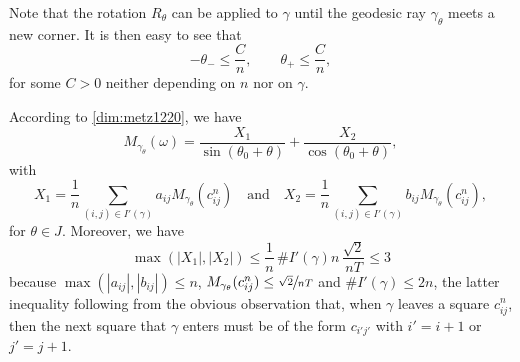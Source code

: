 \documentclass[10pt]{amsart}
\theoremstyle{definition}
\begin{document}
Note that the rotation $R_\theta$ can be applied to $\gamma$ until the geodesic ray $\gamma_\theta$ meets a new corner. It is then easy to see that
\begin{equation} \label{thetapm}
-\theta_- \leq \frac{C}{n}, \qquad\theta_+ \leq \frac{C}{n},
\end{equation}
for some $C>0$ neither depending on $n$ nor on $\gamma$.

According to \eqref{dim:metz1220}, we have
\begin{equation}\label{metz:2248}
M_{\gamma_\theta }(\omega)=\frac{X_1}{\sin (\theta_0+\theta)}+\frac{X_2}{\cos (\theta_0+\theta)},
\end{equation}
with
\[
X_1=\frac{1}{n}\sum_{(i,j)\in I'(\gamma)}a_{ij} M_{\gamma_\theta}(c_{ij}^n)\quad \text{and}\quad X_2=\frac{1}{n}\sum_{(i,j)\in I'(\gamma)}b_{ij} M_{\gamma_\theta}(c_{ij}^n),
\]
for $\theta\in J$.
Moreover, we have
{
\[
\max (|X_1|,|X_2|)\leq \frac{1}{n}\,\# I'(\gamma)n\,\frac{\sqrt{2}}{nT}\leq 3
\]
because $\max (|a_{ij}|,|b_{ij}|) \leq n$, $M_{\gamma_\theta}(c_{ij}^n)\leq \sfrac{\sqrt{2}}{nT}$ and $\# I'(\gamma)\leq 2n$, the latter inequality following from the obvious observation that, when $\gamma$ leaves a square $c_{ij}^n$, then the next square that $\gamma$ enters must be of the form $c_{i'j'}$ with $i'=i+1$ or $j'=j+1$.
}
\end{document}
